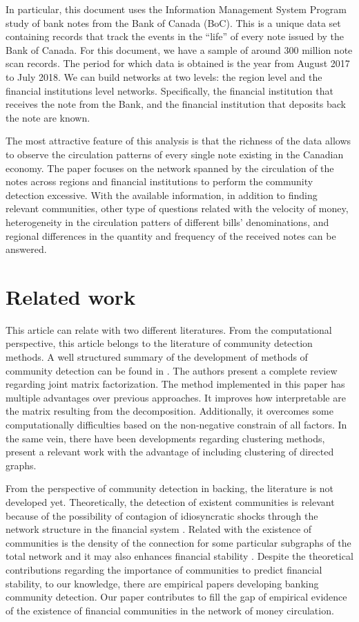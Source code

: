 \documentclass[11pt,letter]{article}%
\numberwithin{equation}{section}
\begin{document}
In particular, this document uses the Information Management System Program study of bank notes from the Bank of Canada (BoC). This is a unique data set containing records that track the events in the ``life'' of every note issued by the Bank of Canada. For this document, we have a sample of around 300 million note scan records. The period for which data is obtained is the year from August 2017 to July 2018. We can build networks at two levels:  the region level and the financial institutions level networks. Specifically, the financial institution that receives the note from the Bank, and the financial institution that deposits back the note are known.  

The most attractive feature of this analysis is that the richness of the data allows to observe the circulation patterns of every single note existing in the Canadian economy. The paper focuses on the network spanned by the circulation of the notes across regions and financial institutions to perform the community detection excessive. With the available information, in addition to finding relevant communities, other type of questions related with the velocity of money, heterogeneity in the circulation patters of different bills' denominations,	 and regional differences in the quantity and frequency of the received notes can be answered.


\section{Related work}

This article can relate with two different literatures. From the computational perspective, this article belongs to the literature of community detection methods. A well structured summary of the development of methods of community detection can be found in \cite{Du2017}. The authors present a complete review regarding joint matrix factorization. The method implemented in this paper has multiple advantages over previous approaches. It improves how interpretable are the matrix resulting from the decomposition. Additionally, it overcomes some computationally difficulties based on the non-negative constrain of all factors. In the same vein, there have been developments regarding clustering methods, \cite{2018CCod} present a relevant work with the advantage of including clustering of directed graphs.

From the perspective of community detection in backing, the literature is not developed yet. Theoretically, the detection of existent communities is relevant because of the possibility of contagion of idiosyncratic shocks through the network structure in the financial system \citep{Gai2010}. Related with the existence of communities is the density of the connection for some particular subgraphs of the total network and it may also enhances financial stability \citep{acemoglu2015}. Despite the theoretical contributions regarding the importance of communities to predict financial stability, to our knowledge, there are empirical papers developing banking community detection. Our paper contributes to fill the gap of empirical evidence of the existence of financial communities in the network of money circulation.
\end{document}
